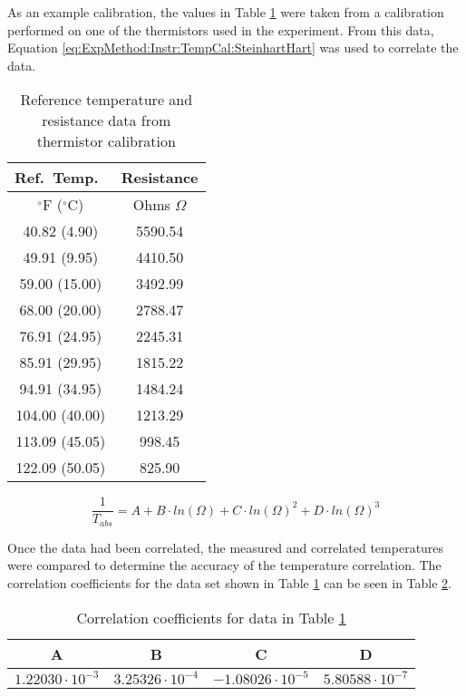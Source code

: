 As an example calibration, the values in Table \ref{tab:ExpMethod:Instr:TempCal:CalData} were taken from a calibration performed on one of the thermistors used in the experiment. From this data, Equation \ref{eq:ExpMethod:Instr:TempCal:SteinhartHart} \citep{SteinhartHart1968} was used to correlate the data.

\begin{table}[h]
	\centering
	\caption{Reference temperature and resistance data from thermistor calibration}
	\label{tab:ExpMethod:Instr:TempCal:CalData}
	\begin{tabular}{c | c}
	\hline
	Ref.\ Temp.\ & Resistance \\
	\hline
	$^\circ$F ($^\circ$C) & Ohms $\Omega$\\
	\hline\hline
	40.82 (4.90) & 5590.54 \\
	\hline
	49.91 (9.95) & 4410.50 \\
	\hline
	59.00 (15.00) & 3492.99 \\
	\hline
	68.00 (20.00) & 2788.47 \\
	\hline
	76.91 (24.95) & 2245.31 \\
	\hline
	85.91 (29.95) & 1815.22 \\
	\hline
	94.91 (34.95) & 1484.24 \\
	\hline
	104.00 (40.00) & 1213.29 \\
	\hline
	113.09 (45.05) & 998.45 \\
	\hline
	122.09 (50.05) & 825.90 \\
	\hline
	\end{tabular}
\end{table}

\begin{equation}
	\frac{1}{T_{abs}} = A + B \cdot ln(\Omega) + C \cdot ln(\Omega)^2 + D \cdot ln(\Omega)^3
	\label{eq:ExpMethod:Instr:TempCal:SteinhartHart}
\end{equation}

Once the data had been correlated, the measured and correlated temperatures were compared to determine the accuracy of the temperature correlation. The correlation coefficients for the data set shown in Table \ref{tab:ExpMethod:Instr:TempCal:CalData} can be seen in Table \ref{tab:ExpMethod:Instr:TempCal:Coefficients}.

\begin{table}[h]
	\centering
	\caption{Correlation coefficients for data in Table \ref{tab:ExpMethod:Instr:TempCal:CalData}}
	\label{tab:ExpMethod:Instr:TempCal:Coefficients}
	\begin{tabular}{c|c|c|c}
	\hline
	A & B & C & D \\
	\hline
	$1.22030 \cdot 10^{-3}$ & $3.25326 \cdot 10^{-4}$ & $-1.08026 \cdot 10^{-5}$ & $5.80588 \cdot 10^{-7}$ \\
	\hline
	\end{tabular}
\end{table}

